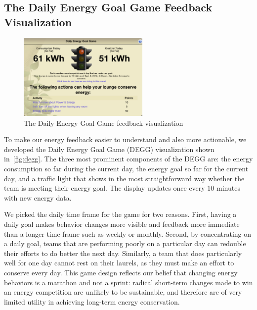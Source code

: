 \documentclass[10pt, conference, compsocconf]{IEEEtran}
\begin{document}
\subsection{The Daily Energy Goal Game Feedback Visualization}

\begin{figure}[!tb]
	\centering
	\includegraphics[width=2.5in]{degg.eps}
	\caption{The Daily Energy Goal Game feedback visualization}
	\label{fig:degg}
\end{figure}

To make our energy feedback easier to understand and also more actionable, we developed the Daily Energy Goal Game (DEGG) visualization shown in~\autoref{fig:degg}. The three most prominent components of the DEGG are: the energy consumption so far during the current day, the energy goal so far for the current day, and a traffic light that shows in the most straightforward way whether the team is meeting their energy goal. The display updates once every 10 minutes with new energy data.

We picked the daily time frame for the game for two reasons. First, having a daily goal makes behavior changes more visible and feedback more immediate than a longer time frame such as weekly or monthly. Second, by concentrating on a daily goal, teams that are performing poorly on a particular day can redouble their efforts to do better the next day. Similarly, a team that does particularly well for one day cannot rest on their laurels, as they must make an effort to conserve every day. This game design reflects our belief that changing energy behaviors is a marathon and not a sprint: radical short-term changes made to win an energy competition are unlikely to be sustainable, and therefore are of very limited utility in achieving long-term energy conservation.
\end{document}

